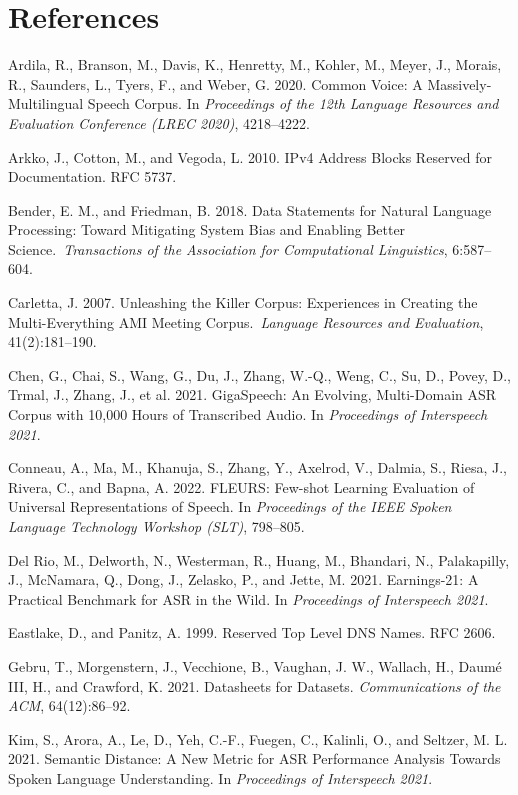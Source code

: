 \documentclass[10pt,twocolumn]{article}
\begin{document}
\section{References}\label{references}

Ardila, R., Branson, M., Davis, K., Henretty, M., Kohler, M., Meyer, J.,
Morais, R., Saunders, L., Tyers, F., and Weber, G. 2020. Common Voice: A
Massively-Multilingual Speech Corpus. In \emph{Proceedings of the 12th
	Language Resources and Evaluation Conference (LREC 2020)}, 4218--4222.

Arkko, J., Cotton, M., and Vegoda, L. 2010. IPv4 Address Blocks Reserved
for Documentation. RFC 5737.

Bender, E. M., and Friedman, B. 2018. Data Statements for Natural
Language Processing: Toward Mitigating System Bias and Enabling Better
Science.\ \emph{Transactions of the Association for Computational
	Linguistics}, 6:587--604.

Carletta, J. 2007. Unleashing the Killer Corpus: Experiences in Creating
the Multi-Everything AMI Meeting Corpus.\ \emph{Language Resources and
	Evaluation}, 41(2):181--190.

Chen, G., Chai, S., Wang, G., Du, J., Zhang, W.-Q., Weng, C., Su, D.,
Povey, D., Trmal, J., Zhang, J., et al. 2021. GigaSpeech: An Evolving,
Multi-Domain ASR Corpus with 10,000 Hours of Transcribed Audio. In
\emph{Proceedings of Interspeech 2021}.

Conneau, A., Ma, M., Khanuja, S., Zhang, Y., Axelrod, V., Dalmia, S.,
Riesa, J., Rivera, C., and Bapna, A. 2022. FLEURS\@: Few-shot Learning
Evaluation of Universal Representations of Speech. In \emph{Proceedings
	of the IEEE Spoken Language Technology Workshop (SLT)}, 798--805.

Del Rio, M., Delworth, N., Westerman, R., Huang, M., Bhandari, N.,
Palakapilly, J., McNamara, Q., Dong, J., Zelasko, P., and Jette, M.
2021. Earnings-21: A Practical Benchmark for ASR in the Wild. In
\emph{Proceedings of Interspeech 2021}.

Eastlake, D., and Panitz, A. 1999. Reserved Top Level DNS Names. RFC
2606.

Gebru, T., Morgenstern, J., Vecchione, B., Vaughan, J. W., Wallach, H.,
Daum\'e III, H., and Crawford, K. 2021. Datasheets for Datasets.
\emph{Communications of the ACM}, 64(12):86--92.

Kim, S., Arora, A., Le, D., Yeh, C.-F., Fuegen, C., Kalinli, O., and
Seltzer, M. L. 2021. Semantic Distance: A New Metric for ASR Performance
Analysis Towards Spoken Language Understanding. In \emph{Proceedings of
	Interspeech 2021}.
\end{document}
